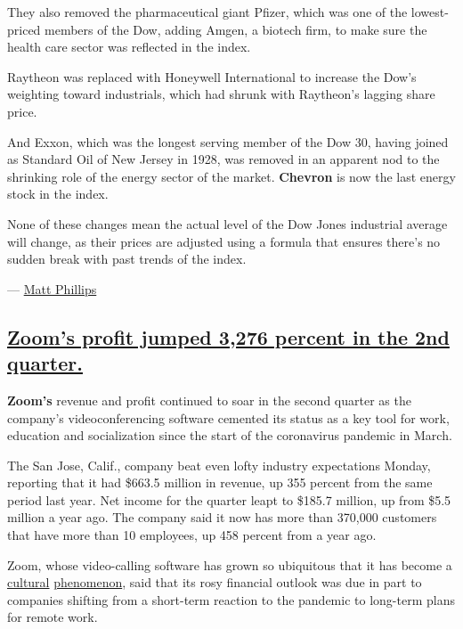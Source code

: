 They also removed the pharmaceutical giant Pfizer, which was one of the
lowest-priced members of the Dow, adding Amgen, a biotech firm, to make
sure the health care sector was reflected in the index.

Raytheon was replaced with Honeywell International to increase the Dow's
weighting toward industrials, which had shrunk with Raytheon's lagging
share price.

And Exxon, which was the longest serving member of the Dow 30, having
joined as Standard Oil of New Jersey in 1928, was removed in an apparent
nod to the shrinking role of the energy sector of the market.
\textbf{Chevron} is now the last energy stock in the index.

None of these changes mean the actual level of the Dow Jones industrial
average will change, as their prices are adjusted using a formula that
ensures there's no sudden break with past trends of the index.

--- \href{https://www.nytimes3xbfgragh.onion/by/matt-phillips}{Matt
Phillips}

\hypertarget{zooms-profit-jumped-3276-percent-in-the-2nd-quarter}{%
\subsection{\texorpdfstring{\protect\hyperlink{zooms-profit-jumped-3276-percent-in-the-2nd-quarter}{Zoom's
profit jumped 3,276 percent in the 2nd
quarter.}}{Zoom's profit jumped 3,276 percent in the 2nd quarter.}}\label{zooms-profit-jumped-3276-percent-in-the-2nd-quarter}}

\textbf{Zoom's} revenue and profit continued to soar in the second
quarter as the company's videoconferencing software cemented its status
as a key tool for work, education and socialization since the start of
the coronavirus pandemic in March.

The San Jose, Calif., company beat even lofty industry expectations
Monday, reporting that it had \$663.5 million in revenue, up 355 percent
from the same period last year. Net income for the quarter leapt to
\$185.7 million, up from \$5.5 million a year ago. The company said it
now has more than 370,000 customers that have more than 10 employees, up
458 percent from a year ago.

Zoom, whose video-calling software has grown so ubiquitous that it has
become a
\href{https://www.nytimes3xbfgragh.onion/2020/03/17/style/zoom-parties-coronavirus-memes.html}{cultural}
\href{https://www.nytimes3xbfgragh.onion/2020/06/29/business/zoom-shirt.html}{phenomenon},
said that its rosy financial outlook was due in part to companies
shifting from a short-term reaction to the pandemic to long-term plans
for remote work.

